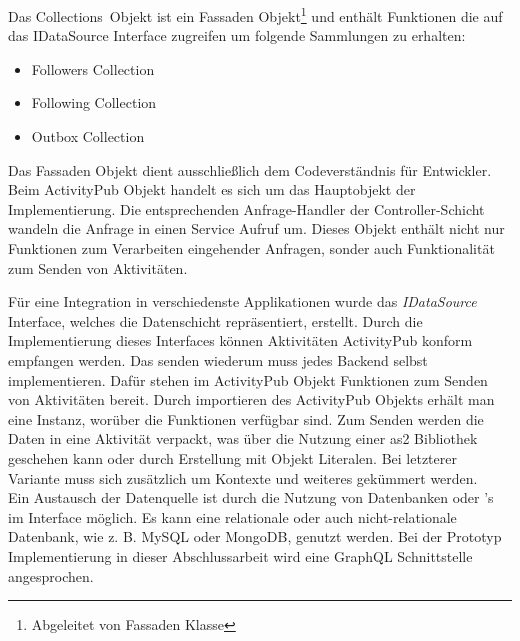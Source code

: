 Das \glqq Collections\grqq~Objekt ist ein Fassaden Objekt\footnote{Abgeleitet von Fassaden Klasse} und enthält Funktionen die auf das IDataSource Interface zugreifen um folgende Sammlungen zu erhalten:
\begin{itemize}
	\item Followers Collection
	\item Following Collection
	\item Outbox Collection
\end{itemize} 
Das Fassaden Objekt dient ausschließlich dem Codeverständnis für Entwickler.\\

Beim ActivityPub Objekt handelt es sich um das Hauptobjekt der Implementierung. Die entsprechenden Anfrage-Handler der Controller-Schicht wandeln die Anfrage in einen Service Aufruf um. Dieses Objekt enthält nicht nur Funktionen zum Verarbeiten eingehender Anfragen, sonder auch Funktionalität zum Senden von Aktivitäten.

Für eine Integration in verschiedenste Applikationen wurde das \textit{IDataSource} Interface, welches die Datenschicht repräsentiert, erstellt. Durch die Implementierung dieses Interfaces können Aktivitäten ActivityPub konform empfangen werden. Das senden wiederum muss jedes Backend selbst implementieren. Dafür stehen im ActivityPub Objekt Funktionen zum Senden von Aktivitäten bereit. Durch importieren des ActivityPub Objekts erhält man eine Instanz, worüber die Funktionen verfügbar sind. Zum Senden werden die Daten in eine Aktivität verpackt, was über die Nutzung einer \gls{as2} Bibliothek geschehen kann oder durch Erstellung mit Objekt Literalen. Bei letzterer Variante muss sich zusätzlich um Kontexte und weiteres gekümmert werden.\\

Ein Austausch der Datenquelle ist durch die Nutzung von Datenbanken oder 's im Interface möglich. Es kann eine relationale oder auch nicht-relationale Datenbank, wie z. B. MySQL oder MongoDB, genutzt werden. Bei der Prototyp Implementierung in dieser Abschlussarbeit wird eine GraphQL Schnittstelle angesprochen.\\

